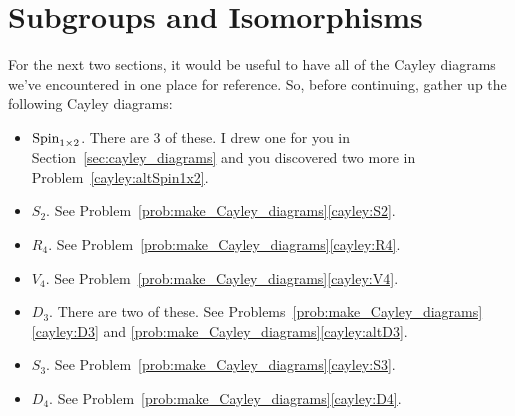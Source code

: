 \chapter{Subgroups and Isomorphisms}
\label{chapter:subgroups_isomorphisms}
\thispagestyle{empty}

For the next two sections, it would be useful to have all of the Cayley diagrams we've encountered in one place for reference. So, before continuing, gather up the following Cayley diagrams:
\begin{itemize}
\item $\operatorname{Spin}_{1\times 2}$. There are 3 of these.  I drew one for you in Section~\ref{sec:cayley_diagrams} and you discovered two more in Problem~\ref{cayley:altSpin1x2}.
\item $S_2$.  See Problem~\ref{prob:make_Cayley_diagrams}\ref{cayley:S2}.
\item $R_4$.  See Problem~\ref{prob:make_Cayley_diagrams}\ref{cayley:R4}.
\item $V_4$.  See Problem~\ref{prob:make_Cayley_diagrams}\ref{cayley:V4}.
\item $D_3$.  There are two of these.  See Problems~\ref{prob:make_Cayley_diagrams}\ref{cayley:D3} and \ref{prob:make_Cayley_diagrams}\ref{cayley:altD3}.
\item $S_3$.  See Problem~\ref{prob:make_Cayley_diagrams}\ref{cayley:S3}.
\item $D_4$.  See Problem~\ref{prob:make_Cayley_diagrams}\ref{cayley:D4}.
\end{itemize}


